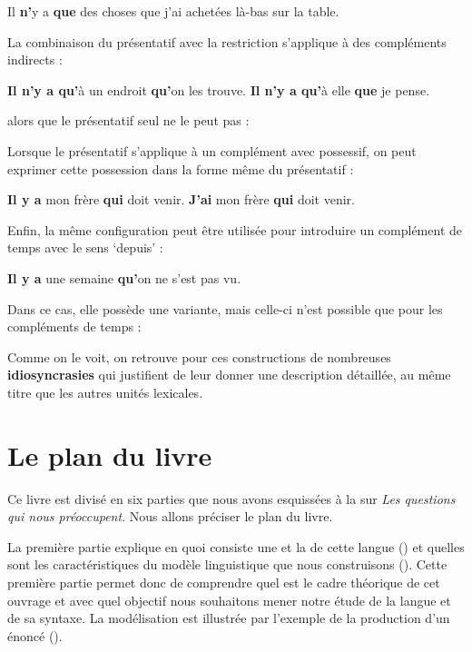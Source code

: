 {   \ea
    {Il} \textbf{{n’}}{y a} \textbf{{que}} {des choses que j’ai} {achetées là-bas} {sur la table.}
    \z

   La combinaison du présentatif avec la restriction s’applique à des compléments indirects :

   \ea
   \ea
    \textbf{{Il n’y} {a qu’}}{à un endroit} \textbf{{qu’}}{on les trouve.}
   \ex
    \textbf{{Il n’y} {a qu’}}{à elle} \textbf{{que}} {je pense.}
   \z
   \z

   alors que le présentatif seul ne le peut pas :

   \ea
   \z
   \z

   Lorsque le présentatif s’applique à un complément avec possessif, on peut exprimer cette possession dans la forme même du présentatif :

   \ea
    \ea \textbf{{Il y a}} {mon frère} \textbf{{qui}} {doit venir.}
    \ex \textbf{{J’ai}} {mon frère} \textbf{{qui}} {doit venir.}
    \z
    \z

   Enfin, la même configuration peut être utilisée pour introduire un complément de temps avec le sens ‘depuis’ :

   \ea
    \textbf{{Il y a}} {une semaine} \textbf{{qu’}}{on ne s’est} {pas vu.}
    \z

   Dans ce cas, elle possède une variante, mais celle-ci n’est possible que pour les compléments de temps :

   \ea
   \z
   \z

   Comme on le voit, on retrouve pour ces constructions de nombreuses \textbf{idiosyncrasies} qui justifient de leur donner une description détaillée, au même titre que les autres unités lexicales.
    }
\section{Le plan du livre}\label{sec:0.0.8}

Ce livre est divisé en six parties que nous avons esquissées à la  sur \textit{Les questions qui nous préoccupent}. Nous allons préciser le plan du livre.

La première partie explique en quoi consiste une  et la  de cette langue () et quelles sont les caractéristiques du modèle linguistique que nous construisons (). Cette première partie permet donc de comprendre quel est le cadre théorique de cet ouvrage et avec quel objectif nous souhaitons mener notre étude de la langue et de sa syntaxe. La modélisation est illustrée par l’exemple de la production d’un énoncé ().


